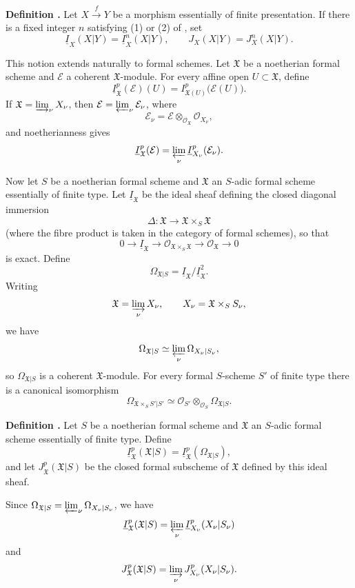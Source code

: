 \medskip
\noindent\textbf{Definition .}
Let $X\xrightarrow{f}Y$ be a morphism essentially of finite
presentation. If there is a fixed integer $n$ satisfying (1) or (2)
of , set
\[
\underline I_X(X|Y)=\underline I_X^n(X|Y),
\qquad
J_X(X|Y)=J_X^n(X|Y).
\]


This notion extends naturally to formal schemes. Let $\mathfrak X$
be a noetherian formal scheme and $\mathcal E$ a coherent
$\mathfrak X$-module. For every affine open $U\subset\mathfrak X$,
define
\[
\underline I_{\mathfrak X}^p(\mathcal E)(U)
=I_{\mathfrak X(U)}^p\bigl(\mathcal E(U)\bigr).
\]
If $\mathfrak X=\varinjlim_\nu X_\nu$, then
$\mathcal E=\varprojlim_\nu\mathcal E_\nu$, where
\[
\mathcal E_\nu
=\mathcal E\otimes_{\mathcal O_{\mathfrak X}}\mathcal O_{X_\nu},
\]
and noetherianness gives
\[
\underline I_{\mathfrak X}^p(\mathcal E)
=\varprojlim_\nu\underline I_{X_\nu}^p(\mathcal E_\nu).
\]

Now let $S$ be a noetherian formal scheme and $\mathfrak X$ an
$S$-adic formal scheme essentially of finite type. Let
$\underline I_{\mathfrak X}$ be the ideal sheaf defining the closed
diagonal immersion
\[
\Delta:\mathfrak X\longrightarrow
\mathfrak X\times_S\mathfrak X
\]
(where the fibre product is taken in the category of formal schemes),
so that
\[
0\longrightarrow\underline I_{\mathfrak X}
\longrightarrow\mathcal O_{\mathfrak X\times_S\mathfrak X}
\longrightarrow\mathcal O_{\mathfrak X}\longrightarrow0
\]
is exact. Define
\[
\Omega_{\mathfrak X|S}
=\underline I_{\mathfrak X}/\underline I_{\mathfrak X}^{2}.
\]
Writing
\[
\mathfrak X=\varinjlim_\nu X_\nu,
\qquad X_\nu=\mathfrak X\times_SS_\nu,
\]
we have
\[
\Omega_{\mathfrak X|S}
\simeq\varprojlim_\nu\Omega_{X_\nu|S_\nu},
\]
so $\Omega_{\mathfrak X|S}$ is a coherent $\mathfrak X$-module.
For every formal $S$-scheme $S'$ of finite type there is a canonical
isomorphism
\[
\Omega_{\mathfrak X\times_SS'|S'}
\simeq
\mathcal O_{S'}\otimes_{\mathcal O_S}\Omega_{\mathfrak X|S}.
\]

\medskip
\noindent\textbf{Definition .}
Let $S$ be a noetherian formal scheme and $\mathfrak X$ an $S$-adic
formal scheme essentially of finite type. Define
\[
\underline I_{\mathfrak X}^p(\mathfrak X|S)
=\underline I_{\mathfrak X}^p(\Omega_{\mathfrak X|S}),
\]
and let $J_{\mathfrak X}^p(\mathfrak X|S)$ be the closed formal
subscheme of $\mathfrak X$ defined by this ideal sheaf.

Since
$\Omega_{\mathfrak X|S}=\varprojlim_\nu\Omega_{X_\nu|S_\nu}$,
we have
\[
\underline I_{\mathfrak X}^p(\mathfrak X|S)
=\varprojlim_\nu\underline I_{X_\nu}^p(X_\nu|S_\nu)
\]
and
\[
J_{\mathfrak X}^p(\mathfrak X|S)
=\varinjlim_\nu J_{X_\nu}^p(X_\nu|S_\nu).
\]


